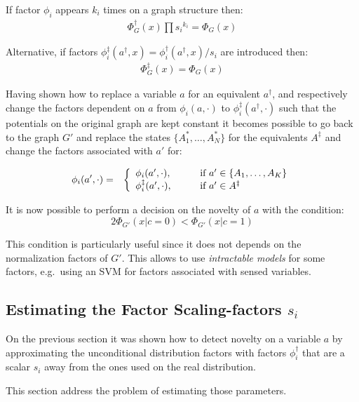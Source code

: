 If factor $\phi_i$ appears $k_i$ times on a graph structure then:
\begin{eqnarray}
\Phi^\dag_G(x) \prod {s_i}^{k_i} = \Phi_G(x)
\end{eqnarray}

Alternative, if factors $\phi^\ddag_i(a^\dag,x) = \phi^\dag_i(a^\dag,x)/s_i$ are
introduced then:
\begin{eqnarray}
\Phi^\ddag_G(x) = \Phi_G(x)
\end{eqnarray}

Having shown how to replace a variable $a$ for an equivalent $a^\dag$, and
respectively change the factors dependent on $a$ from $\phi_i(a,\cdot)$ to
$\phi^\ddag_i(a^\dag,\cdot)$ such that the potentials on the original
graph are kept constant it becomes possible to go back to the graph $G'$ and
replace the states $\{A^*_1,\dotsc,A^*_N\}$ for the equivalents $A^\ddag$
and change the factors associated with $a'$ for:

\begin{eqnarray*}
\phi_i(a', \cdot) &=& \left\{
  \begin{array}{l l}
    \phi_i(a',\cdot), & \qquad \text{if } a' \in \{A_1,\dotsc,A_K\} \\
    \phi^\ddag_i(a', \cdot), & \qquad \text{if } a' \in A^\ddag
  \end{array} \right. \\
\end{eqnarray*}

It is now possible to perform a decision on the novelty of $a$ with the condition:
\begin{equation}
2 \Phi_{G'}(x | c = 0) < \Phi_{G'}(x | c= 1)
\end{equation}

This condition is particularly useful since it does not depends on the normalization
factors of $G'$. This allows to use \emph{intractable models} for some factors,
e.g.\ using an \gls{SVM} for factors associated with sensed variables. 


\subsection{Estimating the Factor Scaling-factors $s_i$}
On the previous section it was shown how to detect novelty on a variable $a$ by
approximating the unconditional distribution factors with factors $\phi^\dag_i$
that are a scalar $s_i$ away from the ones used on the real distribution.

This section address the problem of estimating those parameters.




